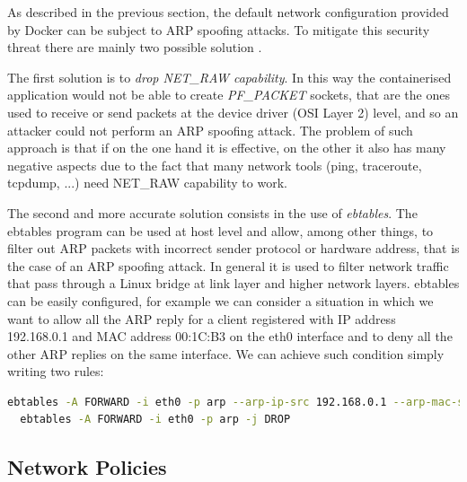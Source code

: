 \documentclass[a4paper,12pt]{article}
\begin{document}
As described in the previous section, the default network configuration provided
by Docker can be subject to ARP spoofing attacks. To mitigate this security
threat there are mainly two possible solution \cite{nyantec_network_docker}.
\par The first solution is to \textit{drop NET\_RAW capability}. In this way the
containerised application would not be able to create \textit{PF\_PACKET}
sockets, that are the ones used to receive or send packets at the device driver
(OSI Layer 2) level, and so an attacker could not perform an ARP spoofing
attack. The problem of such approach is that if on the one hand it is effective,
on the other it also has many negative aspects due to the fact that many network
tools (ping, traceroute, tcpdump, ...) need NET\_RAW capability to work. \par
The second and more accurate solution consists in the use of \textit{ebtables}.
The ebtables program can be used at host level and allow, among other things, to
filter out ARP packets with incorrect sender protocol or hardware address, that
is the case of an ARP spoofing attack. In general it is used to filter network
traffic that pass through a Linux bridge at link layer and higher network
layers. ebtables can be easily configured, for example we can consider a
situation in which we want to allow all the ARP reply for a client registered
with IP address 192.168.0.1 and MAC address 00:1C:B3 on the eth0 interface and
to deny all the other ARP replies on the same interface. We can achieve such
condition simply writing two rules:
\begin{lstlisting}[language=bash,breaklines]
  ebtables -A FORWARD -i eth0 -p arp --arp-ip-src 192.168.0.1 --arp-mac-src 00:1C:B3  -j ACCEPT
  ebtables -A FORWARD -i eth0 -p arp -j DROP
\end{lstlisting}

\subsection{Network Policies}
\end{document}
